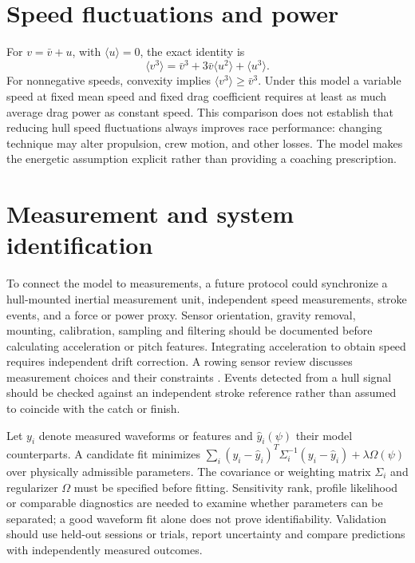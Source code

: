 \documentclass[11pt]{article}
\begin{document}
\section{Speed fluctuations and power}
For $v=\bar v+u$, with $\langle u\rangle=0$, the exact identity is
\begin{equation}\langle v^3\rangle=\bar v^3+3\bar v\langle u^2\rangle+\langle u^3\rangle.\end{equation}
For nonnegative speeds, convexity implies $\langle v^3\rangle\geq\bar v^3$. Under this model a variable speed at fixed mean speed and fixed drag coefficient requires at least as much average drag power as constant speed. This comparison does not establish that reducing hull speed fluctuations always improves race performance: changing technique may alter propulsion, crew motion, and other losses. The model makes the energetic assumption explicit rather than providing a coaching prescription.

\section{Measurement and system identification}
To connect the model to measurements, a future protocol could synchronize a hull-mounted inertial measurement unit, independent speed measurements, stroke events, and a force or power proxy. Sensor orientation, gravity removal, mounting, calibration, sampling and filtering should be documented before calculating acceleration or pitch features. Integrating acceleration to obtain speed requires independent drift correction. A rowing sensor review discusses measurement choices and their constraints \cite{worsey}. Events detected from a hull signal should be checked against an independent stroke reference rather than assumed to coincide with the catch or finish.

Let $y_i$ denote measured waveforms or features and $\hat y_i(\psi)$ their model counterparts. A candidate fit minimizes $\sum_i (y_i-\hat y_i)^T\Sigma_i^{-1}(y_i-\hat y_i)+\lambda\Omega(\psi)$ over physically admissible parameters. The covariance or weighting matrix $\Sigma_i$ and regularizer $\Omega$ must be specified before fitting. Sensitivity rank, profile likelihood or comparable diagnostics are needed to examine whether parameters can be separated; a good waveform fit alone does not prove identifiability. Validation should use held-out sessions or trials, report uncertainty and compare predictions with independently measured outcomes. 
\end{document}
